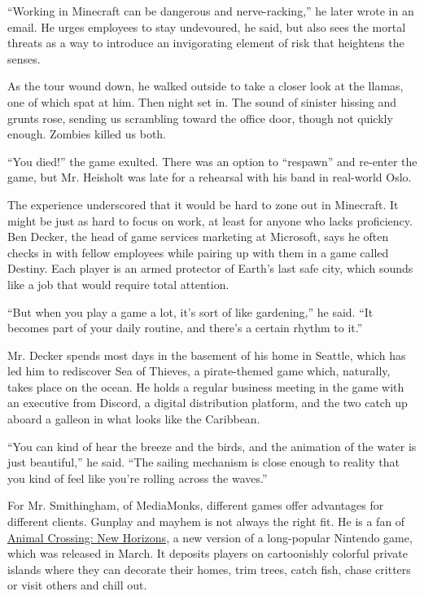 ``Working in Minecraft can be dangerous and nerve-racking,'' he later
wrote in an email. He urges employees to stay undevoured, he said, but
also sees the mortal threats as a way to introduce an invigorating
element of risk that heightens the senses.

As the tour wound down, he walked outside to take a closer look at the
llamas, one of which spat at him. Then night set in. The sound of
sinister hissing and grunts rose, sending us scrambling toward the
office door, though not quickly enough. Zombies killed us both.

``You died!'' the game exulted. There was an option to ``respawn'' and
re-enter the game, but Mr. Heisholt was late for a rehearsal with his
band in real-world Oslo.

The experience underscored that it would be hard to zone out in
Minecraft. It might be just as hard to focus on work, at least for
anyone who lacks proficiency. Ben Decker, the head of game services
marketing at Microsoft, says he often checks in with fellow employees
while pairing up with them in a game called Destiny. Each player is an
armed protector of Earth's last safe city, which sounds like a job that
would require total attention.

``But when you play a game a lot, it's sort of like gardening,'' he
said. ``It becomes part of your daily routine, and there's a certain
rhythm to it.''

Mr. Decker spends most days in the basement of his home in Seattle,
which has led him to rediscover Sea of Thieves, a pirate-themed game
which, naturally, takes place on the ocean. He holds a regular business
meeting in the game with an executive from Discord, a digital
distribution platform, and the two catch up aboard a galleon in what
looks like the Caribbean.

``You can kind of hear the breeze and the birds, and the animation of
the water is just beautiful,'' he said. ``The sailing mechanism is close
enough to reality that you kind of feel like you're rolling across the
waves.''

For Mr. Smithingham, of MediaMonks, different games offer advantages for
different clients. Gunplay and mayhem is not always the right fit. He is
a fan of
\href{https://www.nytimes.com/2020/04/07/arts/animal-crossing-covid-coronavirus-popularity-millennials.html}{Animal
Crossing: New Horizons}, a new version of a long-popular Nintendo game,
which was released in March. It deposits players on cartoonishly
colorful private islands where they can decorate their homes, trim
trees, catch fish, chase critters or visit others and chill out.

